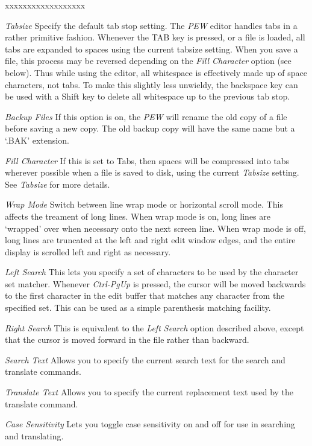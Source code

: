\begin{describe}{xxxxxxxxxxxxxxxxxx}
\item[\em Tabsize]Specify the default tab stop setting. The {\em PEW}
editor handles tabs in a rather primitive fashion. Whenever the TAB
key is pressed, or a file is loaded, all tabs are expanded to spaces
using the current tabsize setting. When you save a file, this process
may be reversed depending on the {\em Fill Character} option (see
below). Thus while using the editor, all whitespace is effectively
made up of space characters, not tabs. To make this slightly less
unwieldy, the backspace key can be used with a Shift key to delete
all whitespace up to the previous tab stop.
\item [\em Backup Files]If this option is on, the {\em PEW} will
rename the old copy of a file before saving a new copy. The old
backup copy will have the same name but a `.BAK' extension.
\item[\em Fill Character]If this is set to Tabs, then spaces will be
compressed into tabs wherever possible when a file is saved to disk,
using the current {\em Tabsize} setting. See {\em Tabsize} for more
details.
\item[\em Wrap Mode]Switch between line wrap mode or horizontal
scroll mode. This affects the treament of long lines. When wrap mode
is on, long lines are `wrapped' over when necessary onto the next
screen line. When wrap mode is off, long lines are truncated at the
left and right edit window edges, and the entire display is scrolled
left and right as necessary.
\item[\em Left Search]This lets you specify a set of characters to be
used by the character set matcher. Whenever {\em Ctrl-PgUp} is
pressed, the cursor will be moved backwards to the first character in the edit
buffer that matches any character from the specified set. This can be
used as a simple parenthesis matching facility.
\item[\em Right Search]This is equivalent to the {\em Left Search}
option described above, except that the cursor is moved forward in
the file rather than backward.
\item[\em Search Text]Allows you to specify the current search text for the search
and translate commands.
\item[\em Translate Text]Allows you to specify the current
replacement text used by the translate command.
\item[\em Case Sensitivity]Lets you toggle case sensitivity on and off
for use in searching and translating.

\end{describe}
